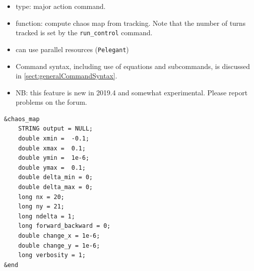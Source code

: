 \documentclass[11pt]{article}
\begin{document}
\begin{itemize}
\item type: major action command.  
\item function: compute chaos map from tracking.
      Note that the number of turns tracked is set by the \verb|run_control| command.
\item can use parallel resources (\verb|Pelegant|)
\item Command syntax, including use of equations and subcommands, is discussed in \ref{sect:generalCommandSyntax}.
\item NB: this feature is new in 2019.4 and somewhat experimental. Please report problems on the forum.
\end{itemize}

\begin{verbatim}
&chaos_map
    STRING output = NULL;
    double xmin =  -0.1;
    double xmax =  0.1;
    double ymin =  1e-6;
    double ymax =  0.1;
    double delta_min = 0;
    double delta_max = 0;
    long nx = 20;
    long ny = 21;
    long ndelta = 1;
    long forward_backward = 0;
    double change_x = 1e-6;
    double change_y = 1e-6;
    long verbosity = 1;
&end
\end{verbatim}
\end{document}
